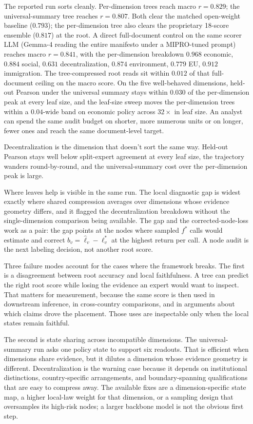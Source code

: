 The reported run sorts cleanly. Per-dimension trees reach macro
\(r=0.829\); the universal-summary tree reaches \(r=0.807\). Both
clear the matched open-weight baseline (\(0.793\)); the per-dimension
tree also clears the proprietary 18-score ensemble (\(0.817\)) at
the root. A direct full-document control on the same scorer LLM
(Gemma-4 reading the entire manifesto under a MIPRO-tuned prompt)
reaches macro \(r=0.841\), with the per-dimension breakdown
\(0.968\) economic, \(0.884\) social, \(0.631\) decentralization,
\(0.874\) environment, \(0.779\) EU, \(0.912\) immigration. The
tree-compressed root reads sit within \(0.012\) of that
full-document ceiling on the macro score. On the five well-behaved
dimensions, held-out Pearson under the universal summary stays
within \(0.030\) of the per-dimension peak at every leaf size,
and the leaf-size sweep moves the per-dimension trees within a
\(0.04\)-wide band on economic policy across \(32\times\) in leaf
size. An analyst can spend the same audit budget on shorter, more
numerous units or on longer, fewer ones and reach the same
document-level target.

Decentralization is the dimension that doesn't sort the same way.
Held-out Pearson stays well below split-expert agreement at every
leaf size, the trajectory wanders round-by-round, and the
universal-summary cost over the per-dimension peak is large.

Where leaves help is visible in the same run. The local diagnostic
gap is widest exactly where shared compression averages over
dimensions whose evidence geometry differs, and it flagged the
decentralization breakdown without the single-dimension comparison
being available. The gap and the corrected-node-loss work as a
pair: the gap points at the nodes where sampled \(f^\ast\) calls
would estimate and correct \(b_v=\widehat\ell_v-\ell_v^\ast\) at
the highest return per call. A node audit is the next labeling
decision, not another root score.

Three failure modes account for the cases where the framework
breaks. The first is a disagreement between root accuracy and
local faithfulness. A tree can predict the right root score while
losing the evidence an expert would want to inspect. That matters
for measurement, because the same score is then used in downstream
inference, in cross-country comparisons, and in arguments about
which claims drove the placement. Those uses are inspectable only
when the local states remain faithful.

The second is state sharing across incompatible dimensions. The
universal-summary run asks one policy state to support six
readouts. That is efficient when dimensions share evidence, but it
dilutes a dimension whose evidence geometry is different.
Decentralization is the warning case because it depends on
institutional distinctions, country-specific arrangements, and
boundary-spanning qualifications that are easy to compress away.
The available fixes are a dimension-specific state map, a higher
local-law weight for that dimension, or a sampling design that
oversamples its high-risk nodes; a larger backbone model is not
the obvious first step.

